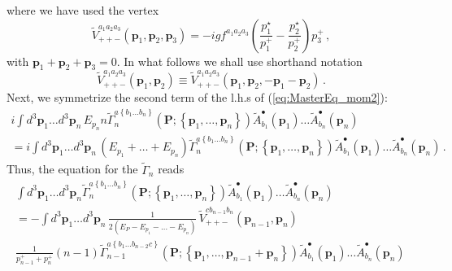 \documentclass[english,american]{article}
\begin{document}
where we have used the vertex 
\begin{equation}
\tilde{V}_{++-}^{a_{1}a_{2}a_{3}}\left(\mathbf{p}_{1},\mathbf{p}_{2},\mathbf{p}_{3}\right)=-igf^{a_{1}a_{2}a_{3}}\left(\frac{p_{1}^{\star}}{p_{1}^{+}}-\frac{p_{2}^{\star}}{p_{2}^{+}}\right)p_{3}^{+}\,,
\end{equation}
with $\mathbf{p}_{1}+\mathbf{p}_{2}+\mathbf{p}_{3}=0$. In what follows
we shall use shorthand notation
\begin{equation}
\tilde{V}_{++-}^{a_{1}a_{2}a_{3}}\left(\mathbf{p}_{1},\mathbf{p}_{2}\right)\equiv\tilde{V}_{++-}^{a_{1}a_{2}a_{3}}\left(\mathbf{p}_{1},\mathbf{p}_{2},-\mathbf{p}_{1}-\mathbf{p}_{2}\right)\,.
\end{equation}
Next, we symmetrize the second term of the l.h.s of (\ref{eq:MasterEq_mom2}):
\begin{multline}
i\int d^{3}\mathbf{p}_{1}\dots d^{3}\mathbf{p}_{n}\, E_{p_{n}}n\tilde{\Gamma}_{n}^{a\left\{ b_{1}\dots b_{n}\right\} }\left(\mathbf{P};\left\{ \mathbf{p}_{1},\dots,\mathbf{p}_{n}\right\} \right)\tilde{A}_{b_{1}}^{\bullet}\left(\mathbf{p}_{1}\right)\dots\tilde{A}_{b_{n}}^{\bullet}\left(\mathbf{p}_{n}\right)\\
=i\int d^{3}\mathbf{p}_{1}\dots d^{3}\mathbf{p}_{n}\,\left(E_{p_{1}}+\dots+E_{p_{n}}\right)\tilde{\Gamma}_{n}^{a\left\{ b_{1}\dots b_{n}\right\} }\left(\mathbf{P};\left\{ \mathbf{p}_{1},\dots,\mathbf{p}_{n}\right\} \right)\tilde{A}_{b_{1}}^{\bullet}\left(\mathbf{p}_{1}\right)\dots\tilde{A}_{b_{n}}^{\bullet}\left(\mathbf{p}_{n}\right)\,.
\end{multline}
Thus, the equation for the $\tilde{\Gamma}_{n}$ reads
\begin{multline}
\int d^{3}\mathbf{p}_{1}\dots d^{3}\mathbf{p}_{n}\tilde{\Gamma}_{n}^{a\left\{ b_{1}\dots b_{n}\right\} }\left(\mathbf{P};\left\{ \mathbf{p}_{1},\dots,\mathbf{p}_{n}\right\} \right)\tilde{A}_{b_{1}}^{\bullet}\left(\mathbf{p}_{1}\right)\dots\tilde{A}_{b_{n}}^{\bullet}\left(\mathbf{p}_{n}\right)\\
=-\int d^{3}\mathbf{p}_{1}\dots d^{3}\mathbf{p}_{n}\,\frac{1}{2\left(E_{P}-E_{p_{1}}-\dots-E_{p_{n}}\right)}\,\tilde{V}_{++-}^{cb_{n-1}b_{n}}\left(\mathbf{p}_{n-1},\mathbf{p}_{n}\right)\\
\frac{1}{p_{n-1}^{+}+p_{n}^{+}}\left(n-1\right)\tilde{\Gamma}_{n-1}^{a\left\{ b_{1}\dots b_{n-2}c\right\} }\left(\mathbf{P};\left\{ \mathbf{p}_{1},\dots,\mathbf{p}_{n-1}+\mathbf{p}_{n}\right\} \right)\tilde{A}_{b_{1}}^{\bullet}\left(\mathbf{p}_{1}\right)\dots\tilde{A}_{b_{n}}^{\bullet}\left(\mathbf{p}_{n}\right)\,\label{eq:MasterEq_mom3}
\end{multline}
\end{document}
